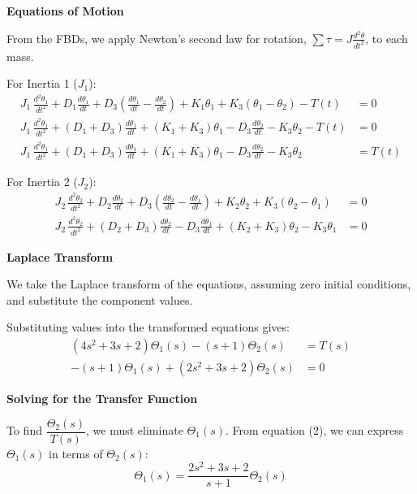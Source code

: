 \documentclass[11pt]{article}
\begin{document}
\noindent\textbf{Equations of Motion}
\vspace{8pt}

\noindent From the FBDs, we apply Newton's second law for rotation, $\sum \tau = J \frac{d^2\theta}{dt^2}$, to each mass.

\vspace{8pt}
{For Inertia 1 ($J_1$):}
\begin{align*}
J_1\,\frac{d^2\theta_1}{dt^2}
+ D_1\frac{d\theta_1}{dt}
+ D_3\!\left(\frac{d\theta_1}{dt}-\frac{d\theta_2}{dt}\right)
+ K_1\theta_1
+ K_3\!\left(\theta_1-\theta_2\right)
- T(t) &= 0 \\[4pt]
J_1\,\frac{d^2\theta_1}{dt^2}
+ (D_1+D_3)\frac{d\theta_1}{dt}
+ (K_1+K_3)\theta_1
- D_3\frac{d\theta_2}{dt}
- K_3\theta_2
- T(t) &= 0 \\[4pt]
J_1\,\frac{d^2\theta_1}{dt^2}
+ (D_1+D_3)\frac{d\theta_1}{dt}
+ (K_1+K_3)\theta_1
- D_3\frac{d\theta_2}{dt}
- K_3\theta_2
&= T(t)
\end{align*}

\newpage
{For Inertia 2 ($J_2$):}
\begin{align*}
J_2\,\frac{d^2\theta_2}{dt^2} 
+ D_2\frac{d\theta_2}{dt}
+ D_3\!\left(\frac{d\theta_2}{dt}-\frac{d\theta_1}{dt}\right)
+ K_2\theta_2
+ K_3\!\left(\theta_2-\theta_1\right) &= 0 \\[4pt]
J_2\,\frac{d^2\theta_2}{dt^2} 
+ (D_2+D_3)\frac{d\theta_2}{dt}
- D_3\frac{d\theta_1}{dt}
+ (K_2+K_3)\theta_2
- K_3\theta_1 &= 0
\end{align*}

\noindent\textbf{Laplace Transform}
\vspace{8pt}

\noindent We take the Laplace transform of the equations, assuming zero initial conditions, and substitute the component values.

\vspace{5pt}
{Substituting values into the transformed equations gives:}
\begin{align}
    (4s^2 + 3s + 2)\Theta_1(s) - (s + 1)\Theta_2(s) &= T(s) \tag{1} \\
    -(s + 1)\Theta_1(s) + (2s^2 + 3s + 2)\Theta_2(s) &= 0 \tag{2}
\end{align}

\noindent\textbf{Solving for the Transfer Function}
\vspace{8pt}

\noindent To find $\dfrac{\Theta_2(s)}{T(s)}$, we must eliminate $\Theta_1(s)$. From equation (2), we can express $\Theta_1(s)$ in terms of $\Theta_2(s)$:
\[
\Theta_1(s) = \frac{2s^2 + 3s + 2}{s + 1} \Theta_2(s)
\]
\end{document}

